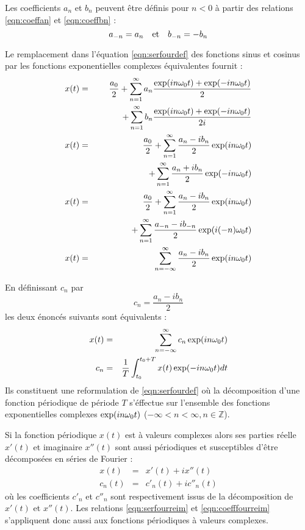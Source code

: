 Les coefficients $a_n$ et $b_n$ peuvent être définis pour $n<0$ 
à partir des relations \ref{eqn:coeffan} et \ref{eqn:coeffbn} :
\begin{equation}
a_{-n} = a_n \quad \mbox{et} \quad b_{-n} = -b_n
\end{equation}

Le remplacement dans l'équation \ref{eqn:serfourdef}
des fonctions sinus et cosinus par les fonctions
exponentielles complexes équivalentes fournit :
\begin{eqnarray}
x(t) & = & \frac{a_0}{2} + 
\sum_{n=1}^{\infty} a_n \frac{\exp(in\omega_0 t)+\exp(-in\omega_0 t)}{2}
\nonumber\\
& & \quad \quad \quad 
+\sum_{n=1}^{\infty} b_n \frac{\exp(in\omega_0 t)+\exp(-in\omega_0 t)}{2i} \\
x(t) & = & \frac{a_0}{2} + 
\sum_{n=1}^{\infty} \frac{a_n-ib_n}{2}\exp(in\omega_0 t)
\nonumber\\
& & \quad \quad \quad 
+\sum_{n=1}^{\infty} \frac{a_n+ib_n}{2}\exp(-in\omega_0 t) \\
x(t) & = & \frac{a_0}{2} + 
\sum_{n=1}^{\infty} \frac{a_n-ib_n}{2}\exp(in\omega_0 t)
\nonumber\\
& & \quad \quad \quad 
+\sum_{n=1}^{\infty} \frac{a_{-n}-ib_{-n}}{2}\exp(i(-n)\omega_0 t) \\
x(t) & = & \sum_{n=-\infty}^{\infty} \frac{a_n-ib_n}{2}\exp(in\omega_0 t)
\end{eqnarray}

En définissant $c_n$ par
\begin{equation}
c_n = \frac{a_n - i b_n}{2}
\end{equation}
les deux énoncés suivants sont équivalents :
\begin{eqnarray}
\label{eqn:serfourreim}
x(t) & = & \sum_{n=-\infty}^{\infty} c_n \exp(in\omega_0 t) \\
\label{eqn:coefffourreim}
c_n & = & \frac{1}{T}\int_{t_0}^{t_0+T} x(t)\exp(-in\omega_0 t)dt
\end{eqnarray}
Ils constituent une reformulation de \ref{eqn:serfourdef} où la décomposition
d'une fonction périodique de période $T$
s'éffectue sur l'ensemble des fonctions exponentielles
complexes $\exp(in\omega_0 t)$ ($-\infty < n < \infty, n \in \mathbb{Z}$).

Si la fonction périodique $x(t)$ est à valeurs complexes alors ses parties réelle
$x'(t)$ et imaginaire $x''(t)$ sont aussi périodiques et susceptibles
d'être décomposées en séries de Fourier :
\begin{eqnarray}
x(t) & = & x'(t) + i x''(t) \\
c_n(t) & = & c'_n(t) + i c''_n(t)
\end{eqnarray}
où les coefficients $c'_n$ et $c''_n$ sont respectivement 
issus de la décomposition de $x'(t)$ et $x''(t)$.
Les relations \ref{eqn:serfourreim} et \ref{eqn:coefffourreim}
s'appliquent donc aussi aux fonctions périodiques à valeurs complexes.

